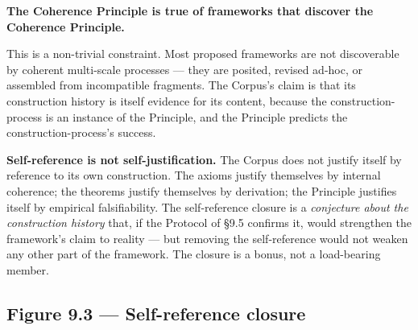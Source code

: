 \documentclass[11pt, openany]{book}
\renewenvironment{quote}{\begin{quoting}}{\end{quoting}}
\begin{document}
\begin{quote}
\textbf{The Coherence Principle is true of frameworks that discover the Coherence Principle.}
\end{quote}

This is a non-trivial constraint. Most proposed frameworks are not discoverable by coherent multi-scale processes --- they are posited, revised ad-hoc, or assembled from incompatible fragments. The Corpus's claim is that its construction history is itself evidence for its content, because the construction-process is an instance of the Principle, and the Principle predicts the construction-process's success.

\textbf{Self-reference is not self-justification.} The Corpus does not justify itself by reference to its own construction. The axioms justify themselves by internal coherence; the theorems justify themselves by derivation; the Principle justifies itself by empirical falsifiability. The self-reference closure is a \textit{conjecture about the construction history} that, if the Protocol of §9.5 confirms it, would strengthen the framework's claim to reality --- but removing the self-reference would not weaken any other part of the framework. The closure is a bonus, not a load-bearing member.

\subsection{Figure 9.3 --- Self-reference closure}
\end{document}
